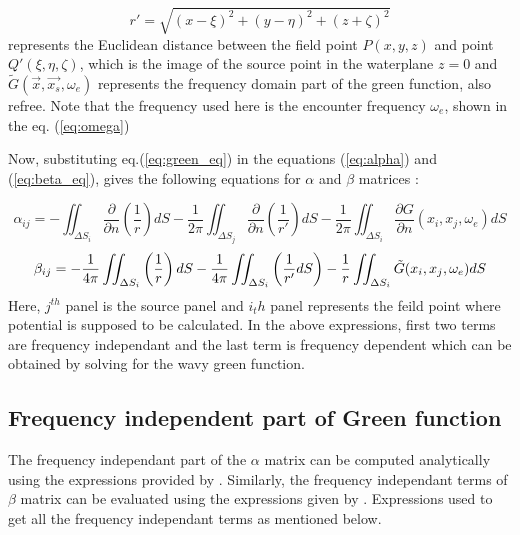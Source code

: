 \begin{equation}
    r' = \sqrt{(x - \xi)^2 + (y - \eta)^2 + (z + \zeta)^2}   
\end{equation}
represents the Euclidean distance between the field point $P(x, y, z)$ and point $Q'(\xi, \eta, \zeta)$, which is the image of the source point in the waterplane $z=0$ and $\tilde{G}(\vec{x}, \vec{x_s}, \omega_e)$ represents the frequency domain part of the green function, also refree. Note that the frequency used here is the encounter frequency $\omega_e$, shown in the eq. (\ref{eq:omega})

Now, substituting eq.(\ref{eq:green_eq}) in the equations (\ref{eq:alpha}) and (\ref{eq:beta_eq}), gives the following equations for $\alpha$ and $\beta$ matrices :

\begin{equation}
    \alpha_{ij} = -\iint_{\Delta S_i} \frac{\partial}{\partial n}\left(\frac{1}{r}\right) dS - \frac{1}{2\pi}\iint_{\Delta S_j} \frac{\partial}{\partial n}\left(\frac{1}{r'}\right) dS
    - \frac{1}{2\pi}\iint_{\Delta S_i} \frac{\partial G}{\partial n}(x_i, x_j, \omega_e) dS
\end{equation}
\begin{equation}
    \beta_{ij} = -\frac{1}{4\pi}\iint_{\Delta S_i}\left(\frac{1}{r}\right) dS - \frac{1}{4\pi}\iint_{\Delta S_i}\left(\frac{1}{r'}dS\right)-\frac{1}{r}\iint_{\Delta S_i} \Tilde{G}(x_i, x_j, \omega_e)dS
\end{equation}
Here, $j^{th}$ panel is the source panel and $i_th$ panel represents the feild point where potential is supposed to be calculated. In the above expressions, first two terms are frequency independant and the last term is frequency dependent which can be obtained by solving for the wavy green function.

\subsection{Frequency independent part of Green function}
The frequency independant part of the $\alpha$ matrix can be computed analytically using the expressions provided by \cite{hess1964calculation}. Similarly, the frequency independant terms of $\beta$ matrix can be evaluated using the expressions given by \cite{katz2001low}. Expressions used to get all the frequency independant terms as mentioned below.

